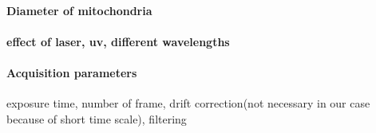 \paragraph{Diameter of mitochondria}

\paragraph{effect of laser, uv, different wavelengths}

\paragraph{Acquisition parameters}
exposure time, number of frame, drift correction(not necessary in our case because of short time scale), filtering